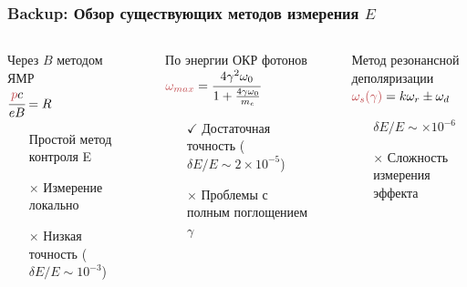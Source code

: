 \documentclass[12pt,aspectratio=169]{beamer}
\begin{document}
\begin{frame}
	\frametitle{Backup: Обзор существующих методов измерения $E$}
	\begin{columns}[T]
		\begin{column}{0.32\linewidth}
			\begin{minipage}{1.\linewidth}
				\centering
				Через $B$ методом ЯМР\\
				$\cfrac{\textcolor{calmRed}{p}c}{eB} = R$
				\small
				\begin{itemize}
					\item[\textcolor{calmGreen}{\checkmark}] Простой метод контроля E
					\item[\textcolor{calmRed}{$\times$}] Измерение локально
					\item[\textcolor{calmRed}{$\times$}] Низкая точность ($\delta E/E \sim 10^{-3}$)
				\end{itemize}
			\end{minipage}
		\end{column}
		\begin{column}{.01\linewidth}
			\rule{.1mm}{.8\textheight}
		\end{column}
		\begin{column}{0.32\linewidth}
			\begin{minipage}{1.\linewidth}
				\centering
				По энергии ОКР фотонов\\
				\small
				\vspace{1em}
				$\color{calmRed} \omega_{max} \color{black}= \cfrac{4\gamma^2 \omega_0}{1+\frac{4\gamma \omega_0}{m_e}}$
				\begin{itemize}
					\item[\textcolor{calmGreen}{$\checkmark$}] Достаточная точность ($\delta E/E \sim  2 \times 10^{-5}$)
					\item[\textcolor{calmRed}{$\times$}]{Проблемы с полным поглощением $\gamma$}
					
				\end{itemize}
			\end{minipage} 
		\end{column}
		\begin{column}{.01\linewidth}
			\rule{.1mm}{.8\textheight}
		\end{column}
		\begin{column}{0.32\linewidth}
			\begin{minipage}{1.\linewidth}
				\centering
				Метод резонансной деполяризации\\
				\small
				\vspace{1em}
				$\color{calmRed}{\omega_s}(\gamma)\color{black}  = k \omega_r \pm \omega_d$
				\begin{itemize}
					\item [\textcolor{calmGreen}{\checkmark}]$\delta E/E \sim  \times 10^{-6}$
					\item [\textcolor{calmRed}{$\times$}] Сложность измерения эффекта
				\end{itemize}
			\end{minipage} 
		\end{column}
	\end{columns}
\end{frame}
\end{document}
